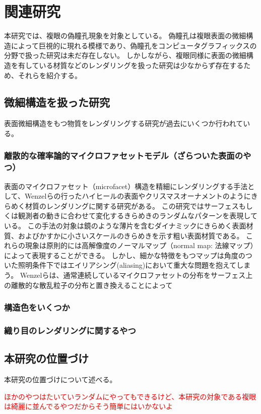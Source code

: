 \chapter{関連研究}
\label{CRelatedWork}

本研究では、複眼の偽瞳孔現象を対象としている。
偽瞳孔は複眼表面の微細構造によって巨視的に現れる模様であり、偽瞳孔をコンピュータグラフィックスの分野で扱った研究は未だ存在しない。
しかしながら、複眼同様に表面の微細構造を有している材質などのレンダリングを扱った研究は少なからず存在するため、それらを紹介する。

\section{微細構造を扱った研究}
\label{SMicrostructure}

表面微細構造をもつ物質をレンダリングする研究が過去にいくつか行われている。

\subsection{離散的な確率論的マイクロファセットモデル（ざらついた表面のやつ）}

表面のマイクロファセット（microfacet）構造を精細にレンダリングする手法として、Wenzel\cite{}らの行ったハイヒールの表面やクリスマスオーナメントのようにきらめく材質のレンダリングに関する研究がある。
この研究ではサーフェスもしくは観測者の動きに合わせて変化するきらめきのランダムなパターンを表現している。
この手法の対象は鏡のような薄片を含むダイナミックにきらめく表面材質、およびかすかに小さいスケールのきらめきを示す粗い表面材質である。
これらの現象は原則的には高解像度のノーマルマップ（normal map: 法線マップ）によって表現することができる。
しかし、細かな特徴をもつマップは角度のついた照明条件下ではエイリアシング(aliasing)において重大な問題を抱えてしまう。
Wenzelらは、通常連続しているマイクロファセットの分布をサーフェス上の離散的な散乱粒子の分布と置き換えることによって



\subsection{構造色をいくつか}
\subsection{織り目のレンダリングに関するやつ}



\section{本研究の位置づけ}
\label{SPosition}

本研究の位置づけについて述べる。

\textcolor{red}{ほかのやつはたいていランダムにやってもできるけど、本研究の対象である複眼は綺麗に並んでるやつだからそう簡単にはいかないよ}
